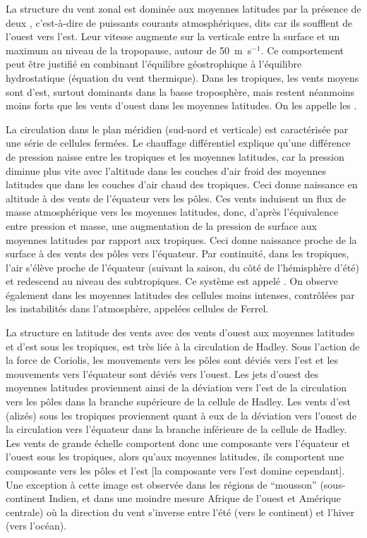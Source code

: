 \sk
La structure du vent zonal est dominée aux moyennes latitudes par la présence de deux , c'est-à-dire de puissants courants atmosphériques, dits  car ils soufflent de l'ouest vers l'est. Leur vitesse augmente sur la verticale entre la surface et un maximum au niveau de la tropopause, autour de 50~m~s$^{-1}$. Ce comportement peut être justifié en combinant l'équilibre géostrophique à l'équilibre hydrostatique (équation du vent thermique). Dans les tropiques, les vents moyens sont d'est, surtout dominants dans la basse troposphère, mais restent néanmoins moins forts que les vents d'ouest dans les moyennes latitudes. On les appelle les .

\sk
La circulation dans le plan méridien (sud-nord et verticale) est caractérisée par une série de cellules fermées. Le chauffage différentiel explique qu'une différence de pression naisse entre les tropiques et les moyennes latitudes, car la pression diminue plus vite avec l'altitude dans les couches d'air froid des moyennes latitudes que dans les couches d'air chaud des tropiques. Ceci donne naissance en altitude à des vents de l'équateur vers les pôles. Ces vents induisent un flux de masse atmosphérique vers les moyennes latitudes, donc, d'après l'équivalence entre pression et masse, une augmentation de la pression de surface aux moyennes latitudes par rapport aux tropiques. Ceci donne naissance proche de la surface à des vents des pôles vers l'équateur. Par continuité, dans les tropiques, l'air s'élève proche de l'équateur (suivant la saison, du côté de l'hémisphère d'été) et redescend au niveau des subtropiques. Ce système est appelé . On observe également dans les moyennes latitudes des cellules moins intenses, contrôlées par les instabilités dans l'atmosphère, appelées cellules de Ferrel. 

\sk
La structure en latitude des vents %
avec des vents d'ouest aux moyennes latitudes et d'est sous les tropiques, est très liée à la circulation de Hadley.
Sous l'action de la force de Coriolis, les mouvements vers les pôles sont déviés vers l'est et les mouvements vers l'équateur sont déviés vers l'ouest. Les jets d'ouest des moyennes latitudes proviennent ainsi de la déviation vers l'est de la circulation vers les pôles dans la branche supérieure de la cellule de Hadley. Les vents d'est (alizés) sous les tropiques proviennent quant à eux de la déviation vers l'ouest de la circulation vers l'équateur dans la branche inférieure de la cellule de Hadley. Les vents de grande échelle comportent donc une composante vers l'équateur et l'ouest sous les tropiques, alors qu'aux moyennes latitudes, ils comportent une composante vers les pôles et l'est [la composante vers l'est domine cependant]. Une exception à cette image est observée dans les régions de ``mousson'' (sous-continent Indien, et dans une moindre mesure Afrique de l'ouest et Amérique centrale) où la direction du vent s'inverse entre l'été (vers le continent) et l'hiver (vers l'océan).

